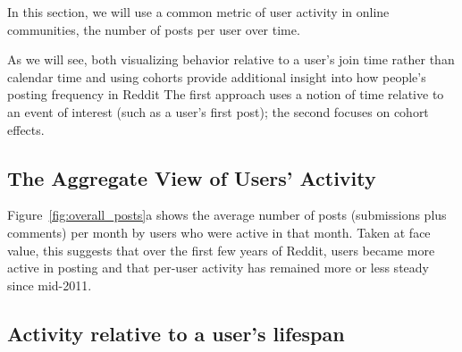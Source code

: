 In this section, we will use a common metric of user activity in online communities, the number of posts per user over time. 

As we will see, both visualizing behavior relative to a user's join time rather than calendar time and using cohorts provide additional insight into how people's posting frequency in Reddit 
The first approach uses a notion of time relative to an event of interest (such as a user's first post); the second focuses on cohort effects.

\subsection{The Aggregate View of Users' Activity}

Figure~\ref{fig:overall_posts}a shows the average number of posts (submissions plus comments) per month by users who were active in that month.  Taken at face value, this suggests that over the first few years of Reddit, users became more active in posting and that per-user activity has remained more or less steady since mid-2011.

\subsection{Activity relative to a user's lifespan}



